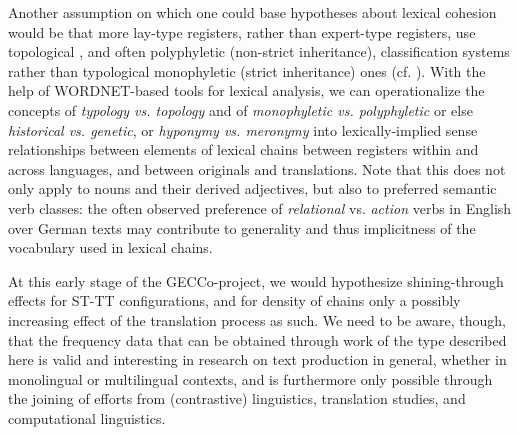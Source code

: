 \documentclass[output=paper]{LSP/langsci}
\begin{document}
\begin{exe}
\begin{exe}
\begin{exe}
\begin{exe}
\begin{exe}
Another assumption on which one could base hypotheses about lexical cohesion would be that more lay-type registers, rather than expert-type registers, use topological , and often polyphyletic (non-strict inheritance), classification systems rather than typological monophyletic (strict inheritance) ones (cf. \citealt[23ff]{Halliday1993}). With the help of WORDNET-based tools for lexical analysis, we can operationalize the concepts of \textit{typology vs. topology} and of \textit{monophyletic vs. polyphyletic} or else \textit{historical vs. genetic}, or \textit{hyponymy vs. meronymy} into lexically-implied sense relationships between elements of lexical chains between registers within and across languages, and between originals and translations. Note that this does not only apply to nouns and their derived adjectives, but also to preferred semantic verb classes: the often observed preference of \textit{relational} vs. \textit{action} verbs in English over German texts may contribute to generality and thus implicitness of the vocabulary used in lexical chains. 

At this early stage of the GECCo-project, we would hypothesize shining-\linebreak through effects for ST-TT configurations, and for density of chains only a possibly increasing effect of the translation process as such. We need to be aware, though, that the frequency data that can be obtained through work of the type described here is valid and interesting in research on text production in general, whether in monolingual or multilingual contexts, and is furthermore only possible through the joining of efforts from (contrastive) linguistics, translation studies, and computational linguistics. 


\end{exe}
\end{exe}
\end{exe}
\end{exe}
\end{exe}
\end{document}
